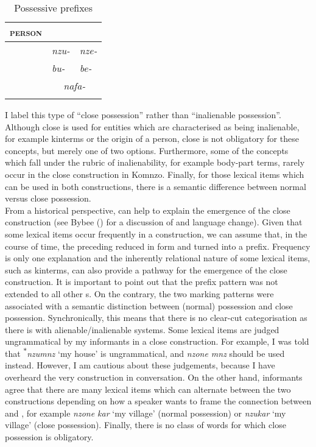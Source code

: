 \begin{table}[H]
\caption{Possessive prefixes} 
\label{posspref}
	\begin{tabular}{lll}
		\lsptoprule
		\textsc{person}	&\Sg&\Nsg\\ \hline
		\First{}&\emph{nzu-}&\emph{nze-}\\
		\Second{}&\emph{bu-}&\emph{be-}\\
		\Third&\multicolumn{2}{c}{\emph{nafa-}\hfill{ }}\\
		\lspbottomrule
	\end{tabular}	
\end{table}%

I label this type of  ``close possession'' rather than ``inalienable possession''. Although close  is used for entities which are characterised as being inalienable, for example kinterms or the origin of a person, close  is not obligatory for these concepts, but merely one of two options. Furthermore, some of the concepts which fall under the rubric of inalienability, for example body-part terms, rarely occur in the close  construction in Komnzo. Finally, for those lexical items which can be used in both  constructions, there is a semantic difference between normal versus close possession.\\

From a historical perspective,  can help to explain the emergence of the close  construction (see Bybee (\citeyear[142]{Bybee:2010wb}) for a discussion of  and language change). Given that some lexical items occur frequently in a  construction, we can assume that, in the course of time, the preceding  reduced in form and turned into a prefix. Frequency is only one explanation and the inherently relational nature of some lexical items, such as kinterms, can also provide a pathway for the emergence of the close  construction. It is important to point out that the prefix pattern was not extended to all other s. On the contrary, the two marking patterns were associated with a semantic distinction between (normal) possession and close possession. Synchronically, this means that there is no clear-cut categorisation as there is with alienable/inalienable systems. Some lexical items are judged ungrammatical by my informants in a close  construction. For example, I was told that \textsuperscript{$\ast$}\emph{nzumnz} `my house' is ungrammatical, and \emph{nzone mnz} should be used instead. However, I am cautious about these judgements, because I have overheard the very construction in conversation. On the other hand, informants agree that there are many lexical items which can alternate between the two  constructions depending on how a speaker wants to frame the connection between  and , for example \emph{nzone kar} `my village' (normal possession) or \emph{nzukar} `my village' (close possession). Finally, there is no class of words for which close possession is obligatory.\\

